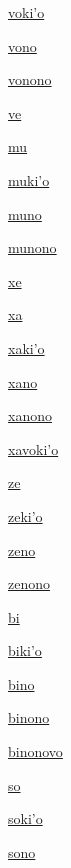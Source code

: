{\hyperlink{val:vokiho}{voki'o}}{}{}{}

{\hyperlink{val:vono}{vono}}{}{}{}

{\hyperlink{val:vonono}{vonono}}{}{}{}

{\hyperlink{val:ve}{ve}}{}{}{}

{\hyperlink{val:mu}{mu}}{}{}{}

{\hyperlink{val:mukiho}{muki'o}}{}{}{}

{\hyperlink{val:muno}{muno}}{}{}{}

{\hyperlink{val:munono}{munono}}{}{}{}

{\hyperlink{val:xe}{xe}}{}{}{}

{\hyperlink{val:xa}{xa}}{}{}{}

{\hyperlink{val:xakiho}{xaki'o}}{}{}{}

{\hyperlink{val:xano}{xano}}{}{}{}

{\hyperlink{val:xanono}{xanono}}{}{}{}

{\hyperlink{val:xavokiho}{xavoki'o}}{}{}{}

{\hyperlink{val:ze}{ze}}{}{}{}

{\hyperlink{val:zekiho}{zeki'o}}{}{}{}

{\hyperlink{val:zeno}{zeno}}{}{}{}

{\hyperlink{val:zenono}{zenono}}{}{}{}

{\hyperlink{val:bi}{bi}}{}{}{}

{\hyperlink{val:bikiho}{biki'o}}{}{}{}

{\hyperlink{val:bino}{bino}}{}{}{}

{\hyperlink{val:binono}{binono}}{}{}{}

{\hyperlink{val:binonovo}{binonovo}}{}{}{}

{\hyperlink{val:so}{so}}{}{}{}

{\hyperlink{val:sokiho}{soki'o}}{}{}{}

{\hyperlink{val:sono}{sono}}{}{}{}

